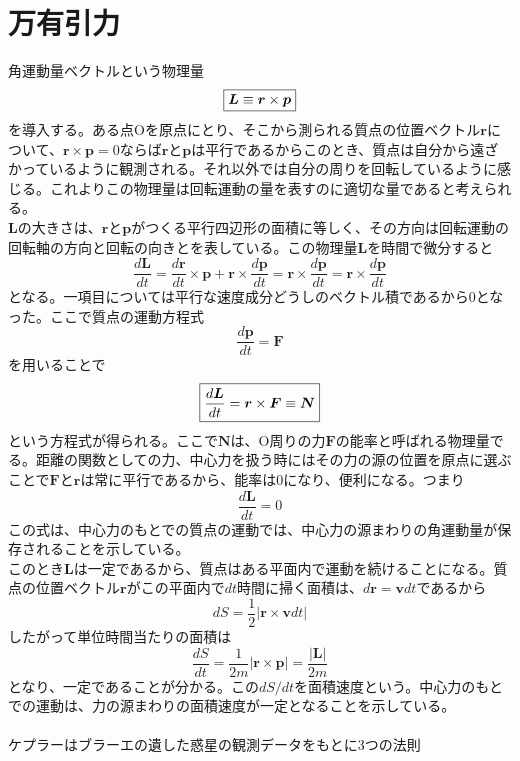 \documentclass{jsarticle}
\begin{document}
\section{万有引力}
\noindent
角運動量ベクトルという物理量
\[\fbox{\(\displaystyle\bm{L}\equiv\bm{r}\times\bm{p}\)}\]
を導入する。ある点Oを原点にとり、そこから測られる質点の位置ベクトル\(\bm{r}\)について、\(\bm{r}\times\bm{p}=0\)ならば\(\bm{r}\)と\(\bm{p}\)は平行であるからこのとき、質点は自分から遠ざかっているように観測される。それ以外では自分の周りを回転しているように感じる。これよりこの物理量は回転運動の量を表すのに適切な量であると考えられる。\\
\(\bm{L}\)の大きさは、\(\bm{r}\)と\(\bm{p}\)がつくる平行四辺形の面積に等しく、その方向は回転運動の回転軸の方向と回転の向きとを表している。この物理量\(\bm{L}\)を時間で微分すると
\[\frac{d\bm{L}}{dt}=\frac{d\bm{r}}{dt}\times\bm{p}+\bm{r}\times\frac{d\bm{p}}{dt}=\bm{r}\times\frac{d\bm{p}}{dt}=\bm{r}\times\frac{d\bm{p}}{dt}\]
となる。一項目については平行な速度成分どうしのベクトル積であるから0となった。ここで質点の運動方程式
\[\frac{d\bm{p}}{dt}=\bm{F}\]
を用いることで
\[\fbox{\(\displaystyle\frac{d\bm{L}}{dt}=\bm{r}\times\bm{F}\equiv\bm{N}\)}\]
という方程式が得られる。ここで\(\bm{N}\)は、O周りの力\(\bm{F}\)の能率と呼ばれる物理量でる。距離の関数としての力、中心力を扱う時にはその力の源の位置を原点に選ぶことで\(\bm{F}\)と\(\bm{r}\)は常に平行であるから、能率は0になり、便利になる。つまり
\[\frac{d\bm{L}}{dt}=0\]
この式は、中心力のもとでの質点の運動では、中心力の源まわりの角運動量が保存されることを示している。\\
このとき\(\bm{L}\)は一定であるから、質点はある平面内で運動を続けることになる。質点の位置ベクトル\(\bm{r}\)がこの平面内で\(dt\)時間に掃く面積は、\(d\bm{r}=\bm{v}dt\)であるから
\[dS=\frac{1}{2}\left|\bm{r}\times\bm{v}dt\right|\]
したがって単位時間当たりの面積は
\[\frac{dS}{dt}=\frac{1}{2m}\left|\bm{r}\times\bm{p}\right|=\frac{|\bm{L}|}{2m}\]
となり、一定であることが分かる。この\(dS/dt\)を面積速度という。中心力のもとでの運動は、力の源まわりの面積速度が一定となることを示している。\\
\\
ケプラーはブラーエの遺した惑星の観測データをもとに3つの法則
\end{document}
